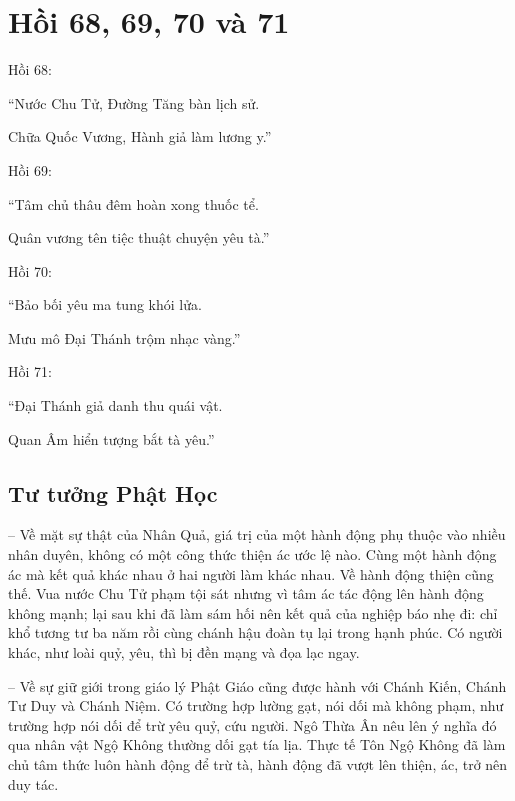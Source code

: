 \chapter{Hồi 68, 69, 70 và 71} %
\label{cha:hoi_68_69}

Hồi 68:

\begin{itshape}
``Nước Chu Tử, Đường Tăng bàn lịch sử.

Chữa Quốc Vương, Hành giả làm lương y.''
\end{itshape}

Hồi 69:

\begin{itshape}
``Tâm chủ thâu đêm hoàn xong thuốc tể.

Quân vương tên tiệc thuật chuyện yêu tà.''
\end{itshape}

Hồi 70:

\begin{itshape}
``Bảo bối yêu ma tung khói lửa.

Mưu mô Đại Thánh trộm nhạc vàng.''
\end{itshape}

Hồi 71:

\begin{itshape}
``Đại Thánh giả danh thu quái vật.

Quan Âm hiển tượng bắt tà yêu.''
\end{itshape}

\section{Tư tưởng Phật Học} %
\label{sec:68_69_phat_hoc}

-- Về mặt sự thật của Nhân Quả, giá trị của một hành động phụ thuộc vào nhiều nhân duyên, không có một công thức thiện ác ước lệ nào. Cùng một hành động ác mà kết quả khác nhau ở hai người làm khác nhau. Về hành động thiện cũng thế. Vua nước Chu Tử phạm tội sát nhưng vì tâm ác tác động lên hành động không mạnh; lại sau khi đã làm sám hối nên kết quả của nghiệp báo nhẹ đi: chỉ khổ tương tư ba năm rồi cùng chánh hậu đoàn tụ lại trong hạnh phúc. Có người khác, như loài quỷ, yêu, thì bị đền mạng và đọa lạc ngay.

-- Về sự giữ giới trong giáo lý Phật Giáo cũng được hành với Chánh Kiến, Chánh Tư Duy và Chánh Niệm. Có trường hợp lường gạt, nói dối mà không phạm, như trường hợp nói dối để trừ yêu quỷ, cứu người. Ngô Thừa Ân nêu lên ý nghĩa đó qua nhân vật Ngộ Không thường dối gạt tía lịa. Thực tế Tôn Ngộ Không đã làm chủ tâm thức luôn hành động để trừ tà, hành động đã vượt lên thiện, ác, trở nên duy tác.

